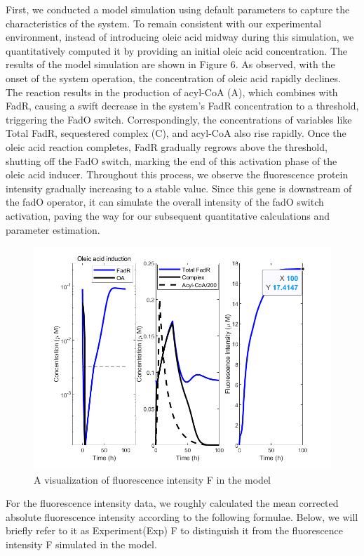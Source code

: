 \documentclass[UTF8]{article}
\begin{document}
First, we conducted a model simulation using default parameters to capture the characteristics of the system. To remain consistent with our experimental environment, instead of introducing oleic acid midway during this simulation, we quantitatively computed it by providing an initial oleic acid concentration. The results of the model simulation are shown in Figure 6. As observed, with the onset of the system operation, the concentration of oleic acid rapidly declines. The reaction results in the production of acyl-CoA (A), which combines with FadR, causing a swift decrease in the system's FadR concentration to a threshold, triggering the FadO switch. Correspondingly, the concentrations of variables like Total FadR, sequestered complex (C), and acyl-CoA also rise rapidly. Once the oleic acid reaction completes, FadR gradually regrows above the threshold, shutting off the FadO switch, marking the end of this activation phase of the oleic acid inducer. Throughout this process, we observe the fluorescence protein intensity gradually increasing to a stable value. Since this gene is downstream of the fadO operator, it can simulate the overall intensity of the fadO switch activation, paving the way for our subsequent quantitative calculations and parameter estimation.

\begin{figure}[h]
	\centering
	\includegraphics[width=0.75\linewidth]{figures/para_est_0mark.png}
	\caption{A visualization of fluorescence intensity F in the model}
	\label{fig:para_est_0}
\end{figure}

For the fluorescence intensity data, we roughly calculated the mean corrected absolute fluorescence intensity according to the following formulae. Below, we will briefly refer to it as Experiment(Exp) F to distinguish it from the fluorescence intensity F simulated in the model.
\end{document}
